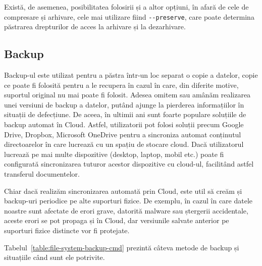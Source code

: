 Există, de asemenea, posibilitatea folosirii și a altor opțiuni, în afară de
cele de compresare și arhivare, cele mai utilizare fiind \texttt{-{}-preserve},
care poate determina păstrarea drepturilor de acces la arhivare și la
dezarhivare.

\subsection{Backup}
\label{sec:file-system-backup}

Backup-ul este utilizat pentru a păstra într-un loc separat o copie a datelor, copie ce
poate fi folosită pentru a le recupera în cazul în care, din diferite motive,
suportul original nu mai poate fi folosit. Adesea omitem sau amânăm realizarea
unei versiuni de backup a datelor, putând ajunge la pierderea informațiilor în
situații de defecțiune. De aceea, în ultimii ani sunt foarte populare soluțiile
de backup automat în Cloud. Astfel, utilizatorii pot folosi soluții precum
Google Drive, Dropbox, Microsoft OneDrive pentru a sincroniza automat conținutul
directoarelor în care lucrează cu un spațiu de stocare cloud. Dacă utilizatorul
lucrează pe mai multe dispozitive (desktop, laptop, mobil etc.) poate fi
configurată sincronizarea tuturor acestor dispozitive cu cloud-ul, facilitând
astfel transferul documentelor.

Chiar dacă realizăm sincronizarea automată prin Cloud, este util să creăm și
backup-uri periodice pe alte suporturi fizice. De exemplu, în cazul în care
datele noastre sunt afectate de erori grave, datorită malware sau ștergerii
accidentale, aceste erori se pot propaga și în Cloud, dar versiunile salvate
anterior pe suporturi fizice distincte vor fi protejate.

Tabelul~\ref{table:file-system-backup-cmd} prezintă câteva metode de backup și situațiile când sunt ele
potrivite.

